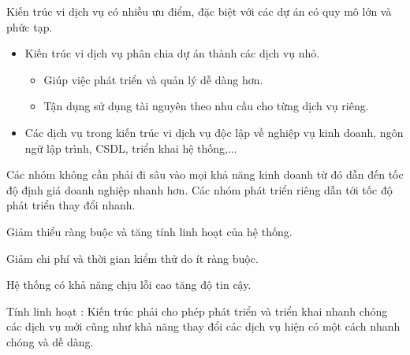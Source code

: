 Kiến trúc vi dịch vụ có nhiều ưu điểm, đặc biệt với các dự án có quy mô lớn và phức tạp.

\begin{itemize}

    \item Kiến trúc vi dịch vụ phân chia dự án thành các dịch vụ nhỏ.

          \begin{itemize}

              \item Giúp việc phát triển và quản lý dễ dàng hơn.

              \item Tận dụng sử dụng tài nguyên theo nhu cầu cho từng dịch vụ riêng.


          \end{itemize}

    \item Các dịch vụ trong kiến trúc vi dịch vụ  độc lập về nghiệp vụ kinh doanh, ngôn ngữ lập trình, CSDL, triển khai hệ thống,...

\end{itemize}
Các nhóm  không cần phải đi sâu vào mọi khả năng kinh doanh từ đó dẫn đến tốc độ định giá doanh nghiệp nhanh hơn.
Các nhóm phát triển riêng dẫn tới tốc độ phát triển thay đổi nhanh.













Giảm thiểu ràng buộc và tăng tính linh hoạt của hệ thống.

Giảm chi phí và thời gian kiểm thử do ít ràng buộc.

Hệ thống có khả năng chịu lỗi cao tăng độ tin cậy.

Tính linh hoạt : Kiến trúc phải cho phép phát triển và triển khai nhanh chóng các dịch vụ mới cũng như khả năng thay đổi các dịch vụ hiện có một cách nhanh chóng và dễ dàng.



